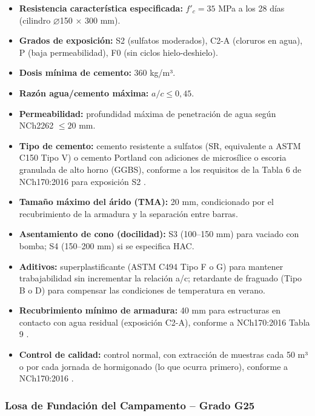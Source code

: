 \begin{itemize}
    \item \textbf{Resistencia característica especificada:} $f'_c = 35$ MPa a los 28 días (cilindro $\varnothing$150 × 300 mm).
    \item \textbf{Grados de exposición:} S2 (sulfatos moderados), C2-A (cloruros en agua), P (baja permeabilidad), F0 (sin ciclos hielo-deshielo).
    \item \textbf{Dosis mínima de cemento:} 360 kg/m³.
    \item \textbf{Razón agua/cemento máxima:} $a/c \leq 0{,}45$.
    \item \textbf{Permeabilidad:} profundidad máxima de penetración de agua según NCh2262 $\leq 20$ mm.
    \item \textbf{Tipo de cemento:} cemento resistente a sulfatos (SR, equivalente a ASTM C150 Tipo V) o cemento Portland con adiciones de microsílice o escoria granulada de alto horno (GGBS), conforme a los requisitos de la Tabla 6 de NCh170:2016 para exposición S2 \cite{NCh170}.
    \item \textbf{Tamaño máximo del árido (TMA):} 20 mm, condicionado por el recubrimiento de la armadura y la separación entre barras.
    \item \textbf{Asentamiento de cono (docilidad):} S3 (100--150 mm) para vaciado con bomba; S4 (150--200 mm) si se especifica HAC.
    \item \textbf{Aditivos:} superplastificante (ASTM C494 Tipo F o G) para mantener trabajabilidad sin incrementar la relación a/c; retardante de fraguado (Tipo B o D) para compensar las condiciones de temperatura en verano.
    \item \textbf{Recubrimiento mínimo de armadura:} 40 mm para estructuras en contacto con agua residual (exposición C2-A), conforme a NCh170:2016 Tabla 9 \cite{NCh170}.
    \item \textbf{Control de calidad:} control normal, con extracción de muestras cada 50 m³ o por cada jornada de hormigonado (lo que ocurra primero), conforme a NCh170:2016 \cite{NCh170}.
\end{itemize}

\subsubsection{Losa de Fundación del Campamento -- Grado G25}

